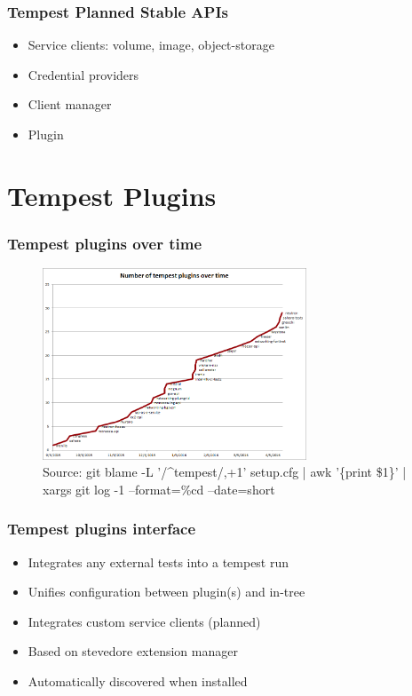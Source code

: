 \documentclass[aspectratio=169,11pt,hyperref={colorlinks=true}]{beamer}
\begin{document}
\begin{frame}
    \frametitle{Tempest Planned Stable APIs}
    \begin{itemize}
        \item{Service clients: volume, image, object-storage}
        \item{Credential providers}
        \item{Client manager}
        \item{Plugin}
    \end{itemize}
\end{frame}

\section{Tempest Plugins}
\begin{frame}
    \frametitle{Tempest plugins over time}
    \begin{figure}[p]
    	\centering
    	\includegraphics[width=0.7\textwidth]{tempest-plugins.png}
        \caption{Source: git blame -L '/\^{}tempest/,+1' setup.cfg | awk '\{print \$1\}' | xargs git log -1 --format=\%cd --date=short}
    \end{figure}
\end{frame}

\begin{frame}
    \frametitle{Tempest plugins interface}
    \begin{itemize}
        \item Integrates any external tests into a tempest run
        \item Unifies configuration between plugin(s) and in-tree
        \item Integrates custom service clients (planned)
    \end{itemize}
    \begin{itemize}
    	\item{Based on stevedore extension manager}
    	\item{Automatically discovered when installed}
    \end{itemize}
\end{frame}
\end{document}
